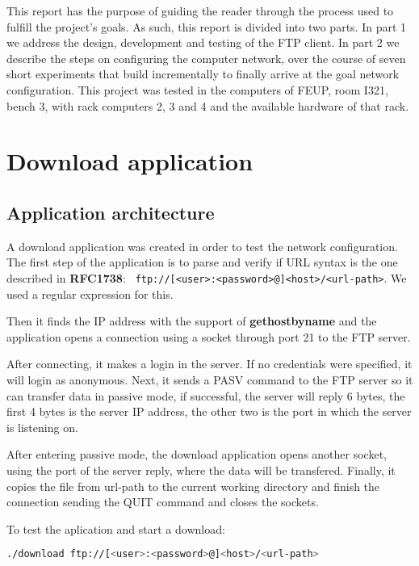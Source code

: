 \documentclass[a4paper, 11pt]{report}
\begin{document}
This report has the purpose of guiding the reader through the process used to fulfill the project's goals. As such, this report is divided into two parts.
In part 1 we address the design, development and testing of the FTP client.
In part 2 we describe the steps on configuring the computer network, over the course of seven short experiments that build incrementally to finally arrive at the goal network configuration.
This project was tested in the computers of FEUP, room I321, bench 3, with rack computers 2, 3 and 4 and the available hardware of that rack.

\section{Download application} \label{sec:Part1}
\subsection{Application architecture} \label{sec:Arc}

A download application was created in order to test the network configuration.
The first step of the application is to parse and verify if URL syntax is the one described in \textbf{RFC1738}: \texttt{ ftp://[<user>:<password>@]<host>/<url-path>}. We used a regular expression for this.

Then it finds the IP address with the support of \textbf{gethostbyname} and the application opens a connection using a socket through port 21 to the FTP server. 

After connecting, it makes a login in the server. If no credentials were specified, it will login as anonymous.
Next, it sends a PASV command to the FTP server so it can transfer data in passive mode, if successful, the server will reply
6 bytes, the first 4 bytes is the server IP address, the other two is the port in which the server is listening on. 

After entering passive mode, the download application opens another socket, using the port of the server reply, where the data will be transfered.
Finally, it copies the file from url-path to the current working directory and finish the connection sending the QUIT command and closes the sockets.

To test the aplication and start a download:

\begin{lstlisting}[frame=none, numbers=none, language=sh]
./download ftp://[<user>:<password>@]<host>/<url-path>
\end{lstlisting}
\end{document}
